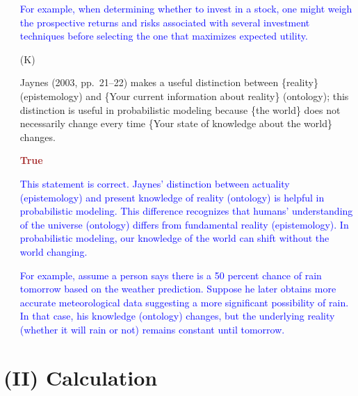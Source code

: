 \documentclass[12pt]{article}
\begin{document}
\begin{itemize}
\textcolor{blue}{For example, when determining whether to invest in a stock, one might weigh the prospective returns and risks associated with several investment techniques before selecting the one that maximizes expected utility.}

\item[(K)]

Jaynes (2003, pp.~21--22) makes a useful distinction between
\{reality\} (epistemology) and \{Your current information about reality\}
(ontology); this distinction is useful in probabilistic modeling because
\{the world\} does not necessarily change every time \{Your state of
knowledge about the world\} changes.

\textcolor{brown}{\textbf{True}}

\textcolor{blue}{This statement is correct. Jaynes' distinction between actuality (epistemology) and present knowledge of reality (ontology) is helpful in probabilistic modeling. This difference recognizes that humans' understanding of the universe (ontology) differs from fundamental reality (epistemology). In probabilistic modeling, our knowledge of the world can shift without the world changing.}

\textcolor{blue}{For example, assume a person says there is a 50 percent chance of rain tomorrow based on the weather prediction. Suppose he later obtains more accurate meteorological data suggesting a more significant possibility of rain. In that case, his knowledge (ontology) changes, but the underlying reality (whether it will rain or not) remains constant until tomorrow.}


\end{itemize}

\section*{(II) Calculation}
\end{document}
